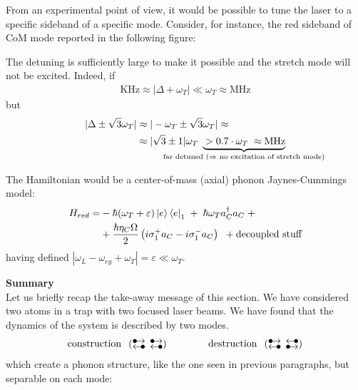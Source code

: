 From an experimental point of view, it would be possible to tune the laser to a specific sideband of a specific mode. Consider, for instance, the red sideband of CoM mode reported in the following figure: 
\begin{center}
    
\end{center}

The detuning is sufficiently large to make it possible and the stretch mode will not be excited. Indeed, if
\begin{align*}
\text{KHz} \approx |\Delta + \omega_T| \ll \omega_T \approx \text{MHz}
\end{align*}
but
\begin{align*}
|\Delta\pm\sqrt{3}\omega_T| & \approx | -\omega_T \pm \sqrt{3}\omega_T| \approx\\
& \approx |\sqrt{3}\pm1|\omega_T  \;
\underbrace{\;> 0.7 \cdot \omega_T \;\approx \text{MHz}}_{ \mathclap{\text{far detuned ($\Rightarrow$ no excitation of stretch mode)}} }
\end{align*}

\noindent The Hamiltonian would be a center-of-mass (axial) phonon Jaynes-Cummings model:
\begin{align}
\begin{split}
H_{red} = & -\hbar(\omega_T +\varepsilon)
    \ket{e}\bra{e}_1 
    \;+\;
    \hbar \omega_{T}a_{C}^\dag a_{C}
    \;+ \\
& +\frac{\hbar\eta_{C}\Omega}{2}
\left( i\sigma_1^+a_{C} - i\sigma_1^-a_{C} \right)
\;\; + \text{decoupled stuff}
\end{split}
\end{align}
having defined $|\omega_L-\omega_{eg}+\omega_T| = \varepsilon \ll \omega_T$. 

\vspace{1cm}
\begin{tcolorbox}
\textbf{Summary}\\

Let us briefly recap the take-away message of this section. We have considered two atoms in a trap with two focused laser beams. We have found that the dynamics of the system is described by two modes.
\begin{equation*}
\text{construction}\;\; \left( \substack{
        \hbox{$\bullet$}\kern-2pt\hbox{$\rightarrow$} \; \; \hbox{$\bullet$}\kern-2pt\hbox{$\rightarrow$} \\ 
        \hbox{$\leftarrow$}\kern-2pt\hbox{$\bullet$}  \; \; \hbox{$\leftarrow$}\kern-2pt\hbox{$\bullet$} } \right)
\qquad\qquad
\text{destruction}\;\;
\left( \substack{ 
        \hbox{$\bullet$}\kern-2pt\hbox{$\rightarrow$} \; \; \hbox{$\leftarrow$}\kern-2pt\hbox{$\bullet$} \\
        \hbox{$\leftarrow$}\kern-2pt\hbox{$\bullet$}  \; \; \hbox{$\bullet$}\kern-2pt\hbox{$\rightarrow$} } \right)
\end{equation*}
which create a phonon structure, like the one seen in previous paragraphs, but separable on each mode:
\begin{center}
    
\end{center}

\end{tcolorbox}
\vspace{1cm}




